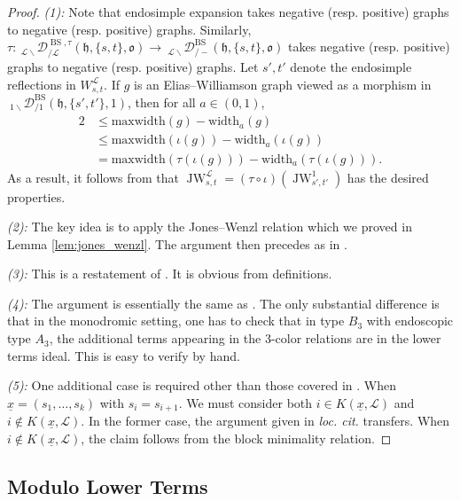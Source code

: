 \documentclass{amsart}
\newcommand{\scrL}{\mathcal{L}}
\newcommand{\fr}[1]{\mathfrak{#1}}
\DeclareMathOperator{\BS}{BS}
\DeclareMathOperator{\JW}{JW}
\newcommand{\EWmon}[2]{\:_{#1 \backslash} \mathcal{D}_{/ #2} }
\newcommand{\ux}{\underline{x}}
\theoremstyle{definition}
\numberwithin{equation}{subsection}
\begin{document}
\begin{proof}
    \emph{(1): } Note that endosimple expansion takes negative (resp. positive) graphs to negative (resp. positive)  graphs.
    Similarly, $\tau : \EWmon{\scrL}{\scrL}^{\BS, \tau} (\fr{h}, \{s,t\}, \fr{o}) \to \EWmon{\scrL}{-}^{\BS} (\fr{h}, \{s,t\}, \fr{o})$ takes negative (resp. positive) graphs to negative (resp. positive) graphs.
    Let $s', t'$ denote the endosimple reflections in $W_{s,t}^{\scrL}$.
    If $g$ is an Elias--Williamson graph viewed as a morphism in $\EWmon{1}{1}^{\BS} (\fr{h}, \{s',t'\}, 1)$, then for all $a \in (0,1)$,
    \begin{align*}
        2 &\leq \text{maxwidth} (g) - \text{width}_a (g) \\
        &\leq \text{maxwidth} (\iota (g)) - \text{width}_a (\iota (g)) \\
        &= \text{maxwidth} (\tau (\iota (g))) - \text{width}_a (\tau (\iota (g))).
    \end{align*}
    As a result, it follows from \cite[Claim 7.1]{EW} that $\JW_{s,t}^{\scrL} = (\tau \circ \iota) (\JW_{s',t'}^1)$ has the desired properties.

    \emph{(2): } The key idea is to apply the Jones--Wenzl relation which we proved in Lemma \ref{lem:jones_wenzl}. The argument then precedes as in \cite[Claim 7.2]{EW}.

    \emph{(3): } This is a restatement of \cite[Claim 7.3]{EW}. It is obvious from definitions.

    \emph{(4): } The argument is essentially the same as \cite[Lemma 7.4]{EW}. The only substantial difference is that in the monodromic setting, one has to check that in type $B_3$ with endoscopic type $A_3$, the additional terms appearing in the 3-color relations are in the lower terms ideal. This is easy to verify by hand.
    
    \emph{(5): } One additional case is required other than those covered in \cite[Lemma 7.5]{EW}. When $\ux = (s_1, \ldots, s_k)$ with $s_i = s_{i+1}$. We must consider both $i \in K (\ux, \scrL)$ and $i \notin K (\ux, \scrL)$.
    In the former case, the argument given in \emph{loc. cit.} transfers. When $i \notin K( \ux, \scrL)$, the claim follows from the block minimality relation.
\end{proof}

\subsection{Modulo Lower Terms}
\end{document}
